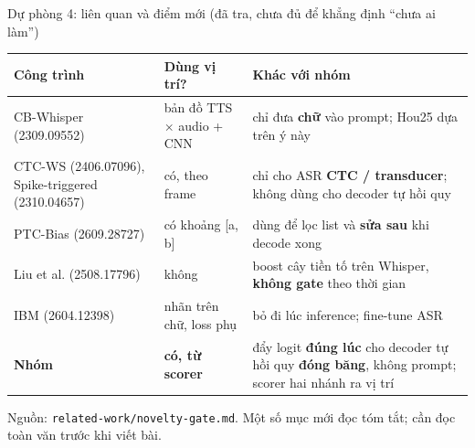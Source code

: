 \documentclass[aspectratio=169,xcolor=table]{beamer}
\begin{document}
\begin{frame}{Dự phòng 4: liên quan và điểm mới (đã tra, chưa đủ để khẳng định ``chưa ai làm'')}
\renewcommand{\arraystretch}{1.18}\scriptsize
\begin{tabular}{L{3.5cm}L{3.5cm}L{6.4cm}}
\toprule
Công trình & Dùng vị trí? & Khác với nhóm \\
\midrule
CB-Whisper (2309.09552) & bản đồ TTS $\times$ audio + CNN & chỉ đưa \textbf{chữ} vào prompt; Hou25 dựa trên ý này \\
CTC-WS (2406.07096), Spike-triggered (2310.04657) & có, theo frame & chỉ cho ASR \textbf{CTC / transducer}; không dùng cho decoder tự hồi quy \\
PTC-Bias (2609.28727) & có khoảng [a, b] & dùng để lọc list và \textbf{sửa sau} khi decode xong \\
Liu et al. (2508.17796) & không & boost cây tiền tố trên Whisper, \textbf{không gate} theo thời gian \\
IBM (2604.12398) & nhãn trên chữ, loss phụ & bỏ đi lúc inference; fine-tune ASR \\
\midrule
\textbf{Nhóm} & \textbf{có, từ scorer} & đẩy logit \textbf{đúng lúc} cho decoder tự hồi quy \textbf{đóng băng}, không prompt; scorer hai nhánh ra vị trí \\
\bottomrule
\end{tabular}
\vspace{0.15cm}

{\footnotesize Nguồn: \texttt{related-work/novelty-gate.md}. Một số mục mới đọc tóm tắt; cần đọc toàn văn trước khi viết bài.}
\end{frame}
\end{document}

